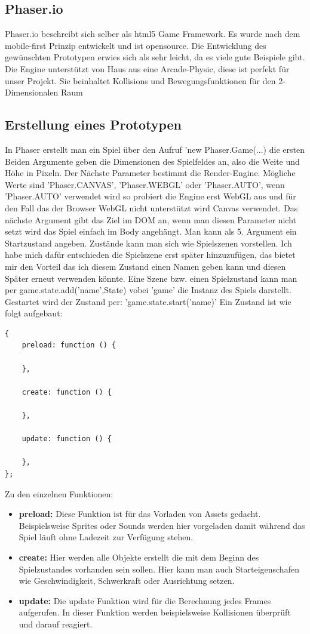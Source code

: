 \subsection{Phaser.io}
Phaser.io beschreibt sich selber als html5 Game Framework. Es wurde nach dem mobile-first Prinzip entwickelt und ist opensource.
Die Entwicklung des gewünschten Prototypen erwies sich als sehr leicht, da es viele gute Beispiele gibt.
Die Engine unterstützt von Haus aus eine Arcade-Physic, diese ist perfekt für unser Projekt. Sie beinhaltet Kollisions und Bewegungsfunktionen für den 2-Dimensionalen Raum
\subsection{Erstellung eines Prototypen}
In Phaser erstellt man ein Spiel über den Aufruf 'new Phaser.Game(...) die ersten Beiden Argumente geben die Dimensionen des Spielfeldes an, also die Weite und Höhe in Pixeln. 
\newline
Der Nächste Parameter bestimmt die Render-Engine. 
Mögliche Werte sind 'Phaser.CANVAS', 'Phaser.WEBGL' oder 'Phaser.AUTO', wenn 'Phaser.AUTO' verwendet wird so probiert die Engine erst WebGL aus und für den Fall das der Browser WebGL nicht unterstützt wird Canvas verwendet.
\newline
Das nächste Argument gibt das Ziel im DOM an, wenn man diesen Parameter nicht setzt wird das Spiel einfach im Body angehängt.
\newline
Man kann als 5. Argument ein Startzustand angeben. Zustände kann man sich wie Spielszenen vorstellen. 
Ich habe mich dafür entschieden die Spielszene erst später hinzuzufügen, das bietet mir den Vorteil das ich diesem Zustand einen Namen geben kann und diesen Später erneut verwenden könnte.
\newpage
Eine Szene bzw. einen Spielzustand kann man per game.state.add('name',State) vobei 'game' die Instanz des Spiels darstellt.
Gestartet wird der Zustand per: 'game.state.start('name)'
Ein Zustand ist wie folgt aufgebaut:
\begin{lstlisting}
{
    preload: function () {
 
    },
 
    create: function () {
 
    },
 
    update: function () {
 
    },
};
\end{lstlisting}
Zu den einzelnen Funktionen:
\begin{itemize}
	\item
	      \textbf{preload:} Diese Funktion ist für das Vorladen von Assets gedacht. Beispielsweise Sprites oder Sounds werden hier vorgeladen damit während das Spiel läuft ohne Ladezeit zur Verfügung stehen.
	\item
	      \textbf{create:} Hier werden alle Objekte erstellt die mit dem Beginn des Spielzustandes vorhanden sein sollen. Hier kann man auch Starteigenschafen wie Geschwindigkeit, Schwerkraft oder Ausrichtung setzen.
	\item
	      \textbf{update:} Die update Funktion wird für die Berechnung jedes Frames aufgerufen. In dieser Funktion werden beispielsweise Kollisionen überprüft und darauf reagiert.
\end{itemize}

